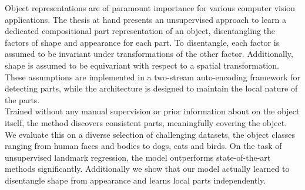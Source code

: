   Object representations are of paramount importance for various computer vision applications. %
  The thesis at hand presents an unsupervised approach to learn a dedicated compositional part representation of an object, disentangling the factors of shape and appearance for each part. %
  To disentangle, each factor is assumed to be invariant under transformations of the other factor. Additionally, shape is assumed to be equivariant with respect to a spatial transformation. These assumptions are implemented in a two-stream auto-encoding framework for detecting parts, while the architecture is designed to maintain the local nature of the parts.\\
  Trained without any manual supervision or prior information about on the object itself, the method discovers consistent parts, meaningfully covering the object. We evaluate this on a diverse selection of challenging datasets, the object classes ranging from human faces and bodies to dogs, cats and birds.
  On the task of unsupervised landmark regression, the model outperforms state-of-the-art methods significantly.
  Additionally we show that our model actually learned to disentangle shape from appearance and learns local parts independently.




